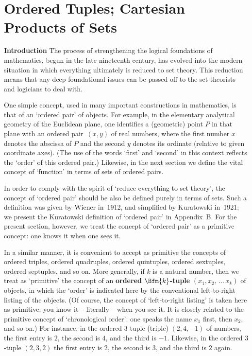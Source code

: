 

                        \section{Ordered Tuples; Cartesian Products of Sets}                        
                        \label{SectA12}


        {\bf Introduction} The process of strengthening the logical foundations of mathematics, begun in the late nineteenth century,
    has evolved into the modern situation in which everything ultimately is reduced to set theory.
    This reduction means that any deep foundational issues can be passed off to the set theorists and logicians to deal with.

        One simple concept, used in many important constructions in mathematics, is that of an `ordered pair' of objects.
    For example, in the elementary analytical geometry of the Euclidean plane, one identifies a (geometric) point $P$ in that plane
    with an ordered pair~$(x,y)$ of real numbers, where the first number $x$ denotes the abscissa of $P$ and the second $y$ denotes its ordinate (relative to given coordinate axes).
    (The use of the words `first' and `second' in this context reflects the `order' of this ordered pair.) Likewise, in the next section we define the vital concept of `function' in terms of sets of ordered pairs.

        In order to comply with the spirit of `reduce everything to set theory', the concept of `ordered pair' should be also be defined purely in terms of sets.
    Such a definition was given by Wiener in~1912, and simplified by Kuratowski in~1921; we present the Kuratowski definition of `ordered pair' in Appendix~B.
    For the present section, however, we treat the concept of `ordered pair' as a primitive concept: one knows it when one sees it.

        In a similar manner, it is convenient to accept as primitive the concepts of ordered triples, ordered quadruples, ordered quintuples, ordered sextuples, ordered septuples, and so on.
    More generally, if $k$ is a natural number, then we treat as `primitive' the concept of an {\bf ordered $\Bfm{k}$-tuple}
    $(x_{1},x_{2},\,{\ldots}\,x_{k})$ of objects, in which the `order' is indicated here by the conventional left-to-right listing of the objects.
    (Of course, the concept of `left-to-right listing' is taken here as primitive: you know it -- literally -- when you see it.
    It is closely related to the primitive concept of `chronological order': one speaks the name $x_{1}$ first, then $x_{2}$, and so on.)
    For instance, in the ordered $3$-tuple (triple) $(2, 4, -1)$ of numbers, the first entry is $2$, the second is $4$, and the third is $-1$.
    Likewise, in the ordered $3$-tuple $(2,3,2)$ the first entry is $2$, the second is $3$, and the third is $2$ again.

